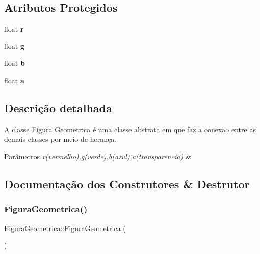 \subsection*{Atributos Protegidos}
\begin{DoxyCompactItemize}
\item 
\mbox{\label{class_figura_geometrica_a0a4f57efb1a6c525c8aeee34c92e7eab}} 
float {\bfseries r}
\item 
\mbox{\label{class_figura_geometrica_a51930549bcb90d016b824f10f95df355}} 
float {\bfseries g}
\item 
\mbox{\label{class_figura_geometrica_a25e5d6c21410103c25ec55c0117dac0d}} 
float {\bfseries b}
\item 
\mbox{\label{class_figura_geometrica_ae7c8a027fcec3c357265b90458a4d165}} 
float {\bfseries a}
\end{DoxyCompactItemize}


\subsection{Descrição detalhada}
A classe Figura Geometrica é uma classe abstrata em que faz a conexao entre as demais classes por meio de herança. 


\begin{DoxyParams}{Parâmetros}
{\em r(vermelho),g(verde),b(azul),a(transparencia)} & \\
\hline
\end{DoxyParams}


\subsection{Documentação dos Construtores \& Destrutor}
\mbox{\label{class_figura_geometrica_a81d7c7efaea511e60a15f5a363138dd9}} 
\subsubsection{\texorpdfstring{Figura\+Geometrica()}{FiguraGeometrica()}}
{\footnotesize\ttfamily Figura\+Geometrica\+::\+Figura\+Geometrica (\begin{DoxyParamCaption}{ }\end{DoxyParamCaption})}



